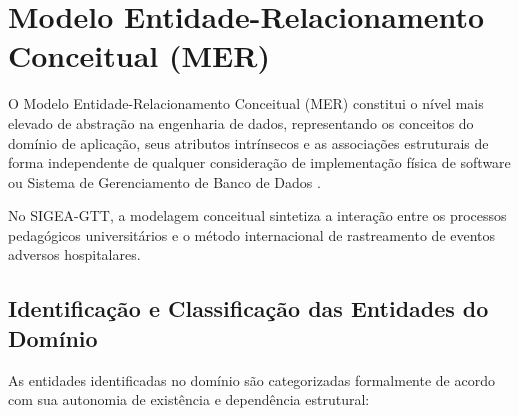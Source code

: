 \chapter{Modelo Entidade-Relacionamento Conceitual (MER)}
\label{cap_modelo_conceitual}

O Modelo Entidade-Relacionamento Conceitual (MER) constitui o nível mais elevado de abstração na engenharia de dados, representando os conceitos do domínio de aplicação, seus atributos intrínsecos e as associações estruturais de forma independente de qualquer consideração de implementação física de software ou Sistema de Gerenciamento de Banco de Dados \cite{chen1976, elmasri2016}.

No SIGEA-GTT, a modelagem conceitual sintetiza a interação entre os processos pedagógicos universitários e o método internacional de rastreamento de eventos adversos hospitalares.

\section{Identificação e Classificação das Entidades do Domínio}
\label{sec_entidades_conceituais}

As entidades identificadas no domínio são categorizadas formalmente de acordo com sua autonomia de existência e dependência estrutural:

